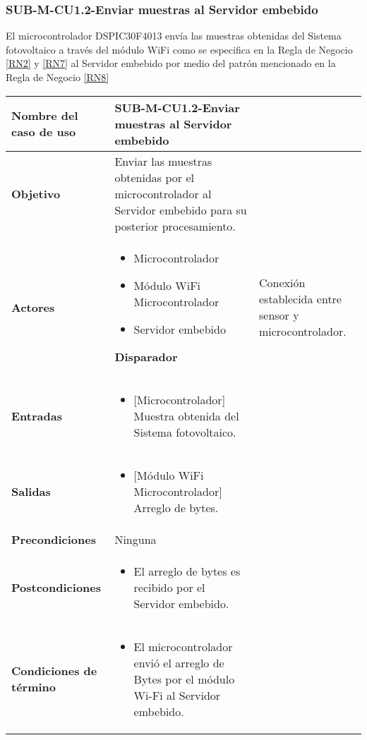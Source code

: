 \subsubsection{SUB-M-CU1.2-Enviar muestras al Servidor embebido}\label{SUB-M-CU1.2}
El microcontrolador DSPIC30F4013 envía las muestras obtenidas del Sistema fotovoltaico a través del módulo WiFi como se especifica en la Regla de Negocio \ref{RN2} y \ref{RN7} al Servidor embebido por medio del patrón mencionado en la Regla de Negocio \ref{RN8}
\begin{longtable}{|J{5cm}|J{10.3cm}|}
	\hline
	\textbf{Nombre del caso de uso} &
		SUB-M-CU1.2-Enviar muestras al Servidor embebido \\ \hline
	\textbf{Objetivo} &
		Enviar las muestras obtenidas por el microcontrolador al Servidor embebido para su posterior procesamiento. \\ \hline
	\textbf{Actores} &
	    \begin{itemize}
		    \item Microcontrolador
		    \item Módulo WiFi Microcontrolador
		    \item Servidor embebido
		\end{itemize} \hline 
	\textbf{Disparador} & 
		Conexión establecida entre sensor y microcontrolador.\\ \hline
	\textbf{Entradas} & %
		\begin{itemize}%
				\item {[Microcontrolador]} Muestra obtenida del Sistema fotovoltaico.
		\end{itemize}
		\\ \hline 
	\textbf{Salidas} & 
	    \begin{itemize}%
	        \item {[Módulo WiFi Microcontrolador]} Arreglo de bytes.
	    \end{itemize}\\ \hline
	\textbf{Precondiciones} & Ninguna
		\\ \hline
	\textbf{Postcondiciones} &
		\begin{itemize}
			\item El arreglo de bytes es recibido por el Servidor embebido.
		\end{itemize} \\ \hline
	\textbf{Condiciones de término} & 
		\begin{itemize}
		    \item El microcontrolador envió el arreglo de Bytes por el módulo Wi-Fi al Servidor embebido.

\end{itemize}
\end{longtable}
